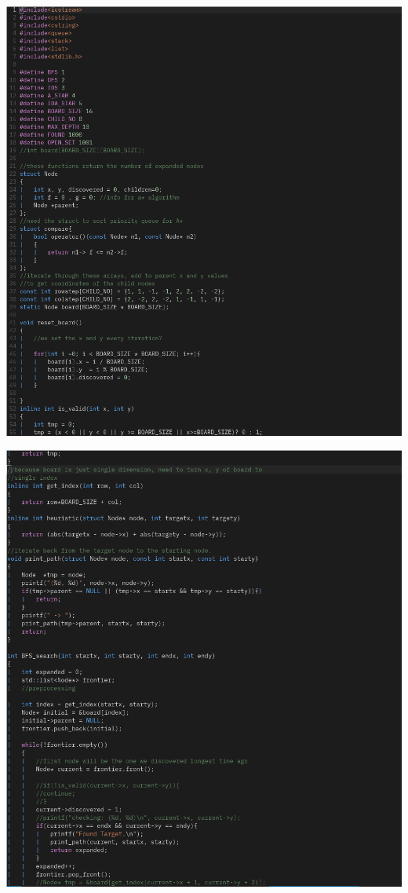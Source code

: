 \documentclass{article}
\begin{document}
\includegraphics[scale=0.5]{sc1.png}

\includegraphics[scale=0.5]{sc2.png}
\end{document}
